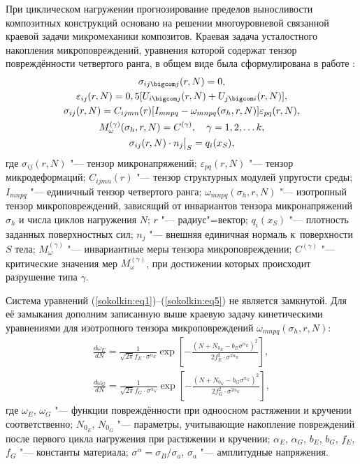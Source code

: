 \smallskip

 При циклическом нагружении
прогнозирование пределов выносливости композитных конструкций
основано на решении многоуровневой связанной краевой задачи
микромеханики композитов. Краевая задача усталостного накопления
микроповреждений, уравнения которой содержат тензор повреждённости
четвертого ранга, в общем виде была сформулирована в работе
\cite{sokolkin:bib2}:
\begin{gather}
\label{sokolkin:eq1}
\sigma_{ij\bigcom j}(r, N)=0,\\
\label{sokolkin:eq2}
\varepsilon _{ij} (r,N)=0,5 [U_{i\bigcom j} (r, N)+U_{j\bigcom i} (r, N)],\\
\label{sokolkin:eq3}
\sigma _{ij} (r, N)=C_{ijmn} (r)[I_{mnpq} -\omega _{mnpq} (\sigma _h , r, N)]\varepsilon _{pq} (r, N),\\
\label{sokolkin:eq4}
M_\omega^{(\gamma )} (\sigma_h , r, N)=C^{(\gamma)},
\quad
\gamma =1, 2, \dots k,\\
\label{sokolkin:eq5}
\sigma _{ij} (r, N)\cdot n_j \big|_S =q_i (x_S),
\end{gather}
где $\sigma _{ij} (r, N)$ "--- тензор микронапряжений; 
$\varepsilon_{pq} (r, N)$ "--- тензор микродеформаций;  \linebreak
$C_{ijmn} (r)$ "--- тензор структурных модулей упругости среды; 
$I_{mnpq} $ "--- единичный тензор четвертого ранга; 
$\omega _{mnpq} (\sigma _h, r, N)$ "--- изотропный тензор микроповреждений, зависящий от инвариантов тензора микронапряжений $\sigma _h $ и числа циклов нагружения $N$;
$r$ "--- радиус"=вектор; 
$q_i (x_S )$ "--- плотность заданных поверхностных сил; 
$n_j$ "--- внешняя единичная нормаль к~поверхности $S$ тела; 
$M_\omega ^{(\gamma )}$ "--- инвариантные меры тензора микроповреждении; 
$C^{(\gamma )}$ "--- критические значения мер $M_\omega ^{(\gamma )} $, при достижении которых происходит разрушение типа $\gamma $.

Система уравнений (\ref{sokolkin:eq1})--(\ref{sokolkin:eq5}) не является замкнутой. 
Для её замыкания дополним записанную выше краевую задачу кинетическими уравнениями для изотропного тензора микроповреждений $\omega _{mnpq} (\sigma _h, r, N)$:
\begin{gather}
\label{sokolkin:eq6}
\frac{d \omega_E }{dN}={\frac{1}{\sqrt{2\pi} f_E  \cdot \sigma^{\alpha_E }}} \exp\left[ -\frac{\left( N+N_{0_E} -b_E \sigma^{\alpha_E }
\right)^2}{2f_E^2 \cdot \sigma^{2\alpha _E}} \right],\\
\label{sokolkin:eq7}
\frac{d\omega_{G}}{dN}=\frac{1}{\sqrt {2\pi}f_{G} \cdot \sigma^{\alpha_{G}
}}\exp\left[ -\frac{\left( N+N_{0_{G }} -b_G \sigma^{\alpha_G}\right)^2}{2f_G^2 \cdot \sigma^{2\alpha _G}} \right],
\end{gather}
где $\omega_E$, $\omega _G$ "--- функции повреждённости при одноосном
растяжении и кручении соответственно; $N_{0_E }$, $N_{0_{G}}$ "--- параметры,
учитывающие накопление повреждений после первого цикла нагружения при
растяжении и кручении; $\alpha_E$, $\alpha_G$, $b_E$, $b_G$, $f_E$, $f_G$ "---
константы материала; $\sigma^\alpha ={\sigma_B}/{\sigma_a}$,
$\sigma_a$ "--- амплитудные напряжения.

